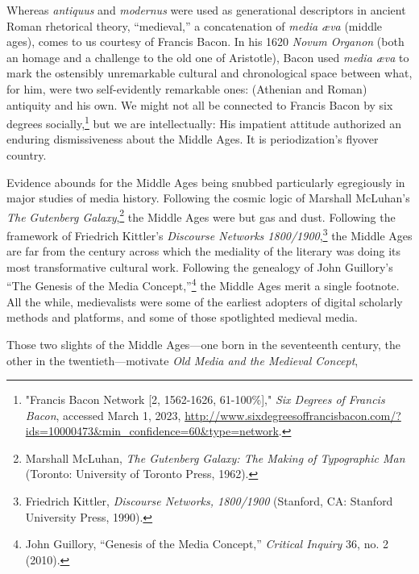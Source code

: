\documentclass{tufte-handout}
\begin{document}
\begin{titlepage}
Whereas \emph{antiquus} and \emph{modernus} were used as generational
descriptors in ancient Roman rhetorical theory, ``medieval,'' a
concatenation of \emph{media æva} (middle ages), comes to us courtesy of
Francis Bacon. In his 1620 \emph{Novum Organon} (both an homage and a
challenge to the old one of Aristotle), Bacon used \emph{media æva} to
mark the ostensibly unremarkable cultural and chronological space
between what, for him, were two self-evidently remarkable ones:
(Athenian and Roman) antiquity and his own. We might not all be
connected to Francis Bacon by six degrees socially,\footnote{"Francis
  Bacon Network {[}2, 1562-1626, 61-100\%{]}," \emph{Six Degrees of
  Francis Bacon}, accessed March 1, 2023,
  \url{http://www.sixdegreesoffrancisbacon.com/?ids=10000473\&min_confidence=60\&type=network}.}
but we are intellectually: His impatient attitude authorized an enduring
dismissiveness about the Middle Ages. It is periodization's flyover
country.

Evidence abounds for the Middle Ages being snubbed particularly
egregiously in major studies of media history. Following the cosmic
logic of Marshall McLuhan's \emph{The} \emph{Gutenberg
Galaxy},\footnote{Marshall McLuhan, \emph{The Gutenberg Galaxy: The
  Making of Typographic Man} (Toronto: University of Toronto Press,
  1962).} the Middle Ages were but gas and dust. Following the framework
of Friedrich Kittler's \emph{Discourse Networks 1800/1900},\footnote{Friedrich
  Kittler, \emph{Discourse Networks, 1800/1900} (Stanford, CA: Stanford
  University Press, 1990).} the Middle Ages are far from the century
across which the mediality of the literary was doing its most
transformative cultural work. Following the genealogy of John Guillory's
``The Genesis of the Media Concept,''\footnote{John Guillory, ``Genesis
  of the Media Concept,'' \emph{Critical Inquiry} 36, no. 2 (2010).} the
Middle Ages merit a single footnote. All the while, medievalists were
some of the earliest adopters of digital scholarly methods and
platforms, and some of those spotlighted medieval media.

Those two slights of the Middle Ages---one born in the seventeenth
century, the other in the twentieth---motivate \emph{Old Media and the Medieval Concept},

\enlargethispage{2\baselineskip}

\vspace*{2em}



 \end{titlepage}
\end{document}
